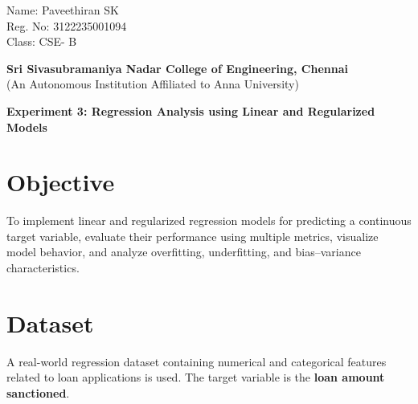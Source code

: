 \documentclass[11pt]{article}
\begin{document}
\begin{flushright}
    Name: Paveethiran SK\\
    Reg. No: 3122235001094 \\
    Class: CSE- B
\end{flushright}
\begin{center}

    \large \textbf{Sri Sivasubramaniya Nadar College of Engineering, Chennai} \\
    (An Autonomous Institution Affiliated to Anna University) \\
    \vspace{0.3cm}
\end{center}

\begin{table}[!h]
\renewcommand{\arraystretch}{1.5}
\end{table}

\begin{center}
\textbf{Experiment 3: Regression Analysis using Linear and Regularized Models}
\end{center}

\section*{Objective}
To implement linear and regularized regression models for predicting a continuous target variable, evaluate their performance using multiple metrics, visualize model behavior, and analyze overfitting, underfitting, and bias--variance characteristics.

\section*{Dataset}
A real-world regression dataset containing numerical and categorical features related to loan applications is used.  
The target variable is the \textbf{loan amount sanctioned}.
\end{document}
